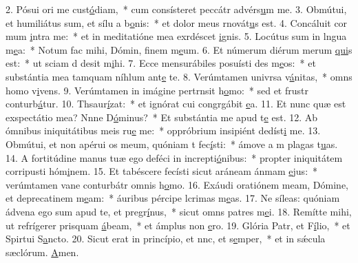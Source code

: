 2. Pósui ori me cust\uline{ó}diam,~* cum consísteret peccátr advérs\uline{u}m me.
3. Obmútui, et humiliátus sum, et sílu a b\uline{o}nis:~* et dolor meus rnovát\uline{u}s est.
4. Concáluit cor mum \uline{i}ntra me:~* et in meditatióne mea exrdéscet \uline{i}gnis.
5. Locútus sum in lngua m\uline{e}a:~* Notum fac mihi, Dómin, finem m\uline{e}um.
6. Et númerum diérum merum \uline{qui}s est:~* ut sciam d desit m\uline{i}hi.
7. Ecce mensurábiles posuísti des m\uline{e}os:~* et substántia mea tamquam níhlum ant\uline{e} te.
8. Verúmtamen univrsa v\uline{á}nitas,~* omns homo v\uline{i}vens.
9. Verúmtamen in imágine pertrnsit h\uline{o}mo:~* sed et frustr conturb\uline{á}tur.
10. Thsaur\uline{í}zat:~* et ignórat cui congrgábit \uline{e}a.
11. Et nunc quæ est exspectátio mea? Nnne D\uline{ó}minus?~* Et substántia me apud t\uline{e} est.
12. Ab ómnibus iniquitátibus meis ru\uline{e} me:~* oppróbrium insipiént dedíst\uline{i} me.
13. Obmútui, et non apérui os meum, quóniam t fec\uline{í}sti:~* ámove a m plagas t\uline{u}as.
14. A fortitúdine manus tuæ ego deféci in increpti\uline{ó}nibus:~* propter iniquitátem corripusti hóm\uline{i}nem.
15. Et tabéscere fecísti sicut aráneam ánmam \uline{e}jus:~* verúmtamen vane conturbátr omnis h\uline{o}mo.
16. Exáudi oratiónem meam, Dómine, et deprecatinem m\uline{e}am:~* áuribus pércipe lcrimas m\uline{e}as.
17. Ne síleas: quóniam ádvena ego sum apud te, et pregr\uline{í}nus,~* sicut omns patres m\uline{e}i.
18. Remítte mihi, ut refrígerer prisquam \uline{á}beam,~* et ámplus non \uline{e}ro.
19. Glória Patr, et F\uline{í}lio,~* et Spirtui S\uline{a}ncto.
20. Sicut erat in princípio, et nnc, et s\uline{e}mper,~* et in sǽcula sæclórum. \uline{A}men.
